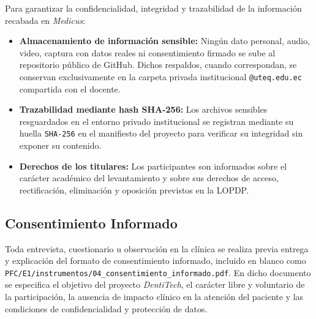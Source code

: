 Para garantizar la confidencialidad, integridad y trazabilidad de la informaci{\'o}n recabada en \textit{Medicus}:

\begin{itemize}
    \item \textbf{Almacenamiento de informaci{\'o}n sensible:} Ning{\'u}n dato personal, audio, video, captura con datos reales ni consentimiento firmado se sube al repositorio p{\'u}blico de GitHub. Dichos respaldos, cuando correspondan, se conservan exclusivamente en la carpeta privada institucional \texttt{@uteq.edu.ec} compartida con el docente.
    \item \textbf{Trazabilidad mediante hash SHA-256:} Los archivos sensibles resguardados en el entorno privado institucional se registran mediante su huella \texttt{SHA-256} en el manifiesto del proyecto para verificar su integridad sin exponer su contenido.
    \item \textbf{Derechos de los titulares:} Los participantes son informados sobre el car{\'a}cter acad{\'e}mico del levantamiento y sobre sus derechos de acceso, rectificaci{\'o}n, eliminaci{\'o}n y oposici{\'o}n previstos en la LOPDP.
\end{itemize}

\subsection{Consentimiento Informado}

Toda entrevista, cuestionario u observaci{\'o}n en la cl{\'i}nica se realiza previa entrega y explicaci{\'o}n del formato de consentimiento informado, incluido en blanco como \texttt{PFC/E1/instrumentos/04\_consentimiento\_informado.pdf}. En dicho documento se especifica el objetivo del proyecto \textit{DentiTech}, el car{\'a}cter libre y voluntario de la participaci{\'o}n, la ausencia de impacto cl{\'i}nico en la atenci{\'o}n del paciente y las condiciones de confidencialidad y protecci{\'o}n de datos.

